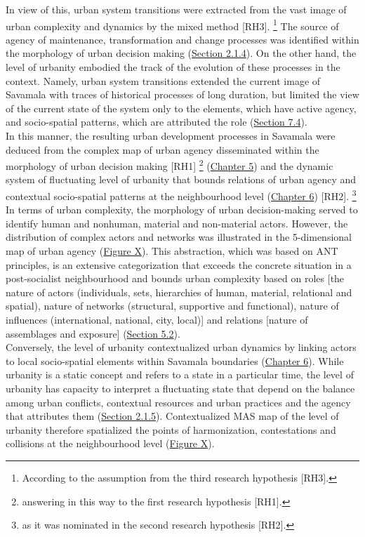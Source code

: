 \documentclass[11pt]{report}
\begin{document}
{In view of this, urban system transitions were extracted from the vast image of urban complexity and dynamics by the mixed method [RH3].
\footnote{According to the assumption from the third research hypothesis [RH3].}
The source of agency of maintenance, transformation and change processes was identified within the morphology of urban decision making (\href{Section 2.1.4}{Section 2.1.4}). On the other hand, the level of urbanity embodied the track of the evolution of these processes in the context.
Namely, urban system transitions extended the current image of Savamala with traces of historical processes of long duration, but limited the view of the current state of the system only to the elements, which have active agency, and socio-spatial patterns, which are attributed the role (\href{Section 7.4}{Section 7.4}).
\\

In this manner, the resulting urban development processes in Savamala were deduced from the complex map of urban agency disseminated within the morphology of urban decision making [RH1]
\footnote{answering in this way to the first research hypothesis [RH1].}
(\href{Chapter 5}{Chapter 5})
and the dynamic system of fluctuating level of urbanity that bounds relations of urban agency and contextual socio-spatial patterns at the neighbourhood level
(\href{Chapter 6}{Chapter 6}) [RH2].
\footnote{as it was nominated in the second research hypothesis [RH2].}
\\

In terms of urban complexity, the morphology of urban decision-making served to identify human and nonhuman, material and non-material actors. However, the distribution of complex actors and networks was illustrated in the 5-dimensional map of urban agency (\href{Figure ANT diagram}{Figure X}).
This abstraction, which was based on ANT principles, is an extensive categorization that exceeds the concrete situation in a post-socialist neighbourhood and bounds urban complexity based on roles [the nature of actors (individuals, sets, hierarchies of human, material, relational and spatial), nature of networks (structural, supportive and functional), nature of influences (international, national, city, local)] and relations [nature of assemblages and exposure] (\href{Section 5.2}{Section 5.2}).
\\

Conversely, the level of urbanity contextualized urban dynamics by linking actors to local socio-spatial elements within Savamala boundaries  (\href{Chapter 6}{Chapter 6}). 
While urbanity is a static concept and refers to a state in a particular time, the level of urbanity has capacity to interpret a fluctuating state that depend on the balance among urban conflicts, contextual resources and urban practices and the agency that attributes them (\href{Section 2.1.5}{Section 2.1.5}).
Contextualized MAS map of the level of urbanity therefore spatialized the points of harmonization, contestations and collisions at the neighbourhood level (\href{Figure MAS diagram}{Figure X}).
\\

}
\end{document}
